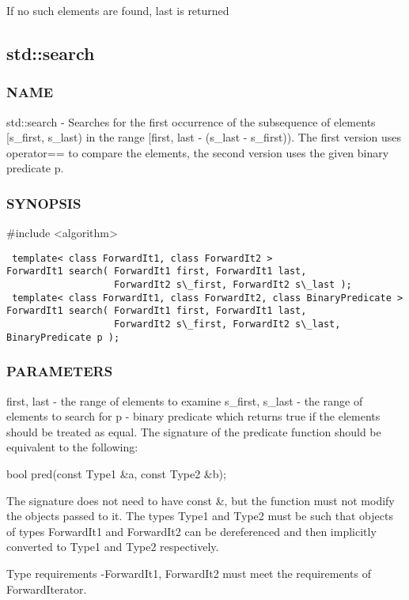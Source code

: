 If no such elements are found, last is returned



\subsection{std::search}

\subsubsection{NAME}
std::search - Searches for the first occurrence of the subsequence of elements [s\_first, s\_last) in the range [first, last - (s\_last - s\_first)). The first version uses operator== to compare the elements, the second version uses the given binary predicate p.

\subsubsection{SYNOPSIS}
\#include <algorithm>

\begin{lstlisting}
 template< class ForwardIt1, class ForwardIt2 >
ForwardIt1 search( ForwardIt1 first, ForwardIt1 last,
                   ForwardIt2 s\_first, ForwardIt2 s\_last );
 template< class ForwardIt1, class ForwardIt2, class BinaryPredicate >
ForwardIt1 search( ForwardIt1 first, ForwardIt1 last,
                   ForwardIt2 s\_first, ForwardIt2 s\_last, BinaryPredicate p );
\end{lstlisting}

\subsubsection{PARAMETERS}
first, last - the range of elements to examine
s\_first, s\_last - the range of elements to search for
p - binary predicate which returns true  if the elements should be treated as equal.
The signature of the predicate function should be equivalent to the following:

 bool pred(const Type1 \&a, const Type2 \&b);

The signature does not need to have const \&, but the function must not modify the objects passed to it.
The types Type1 and Type2 must be such that objects of types ForwardIt1 and ForwardIt2 can be dereferenced and then implicitly converted to Type1 and Type2 respectively.


 Type requirements
 -ForwardIt1, ForwardIt2 must meet the requirements of ForwardIterator.


